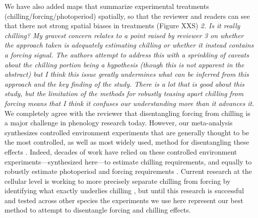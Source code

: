 \documentclass{article}
\begin{document}
We have also added maps that summarize experimental treatments (chilling/forcing/photoperiod) spatially, so that the reviewer and readers can see that there not strong spatial biases in treatments (Figure XXS) 
\emph{2. Is it really chilling? My gravest concern relates to a point raised by reviewer 3 on whether the
approach taken is adequately estimating chilling or whether it instead contains a forcing signal.
The authors attempt to address this with a sprinkling of caveats about the chilling portion
being a hypothesis (though this is not apparent in the abstract) but I think this issue greatly
undermines what can be inferred from this approach and the key finding of the study. There is
a lot that is good about this study, but the limitation of the methods for robustly teasing apart
chilling from forcing means that I think it confuses our understanding more than it advances it.}\\

We completely agree with the reviewer that disentangling forcing from chilling is a major challenge in phenology research today. However, our meta-analysis synthesizes controlled environment experiments that are generally thought to be the most controlled, as well as most widely used, method for disentangling these effects \citep{samish1954,frostbook}. Indeed, decades of work have relied on these controlled environment experiments---synthesized here---to estimate chilling requirements, and equally to robustly estimate photoperiod and forcing requirements \citep[e.g.][]{Junttila:2012aa, Worrall:1967aa}. Current research at the cellular level is working to more precisely separate chilling from forcing by identifying what exactly underlies chilling \citep[e.g., work on the compound callous, see][]{rinne2011,vanderschoot2014}, but until this research is successful and tested across other species the experiments we use here represent our best method to attempt to disentangle forcing and chilling effects. \\
\end{document}
